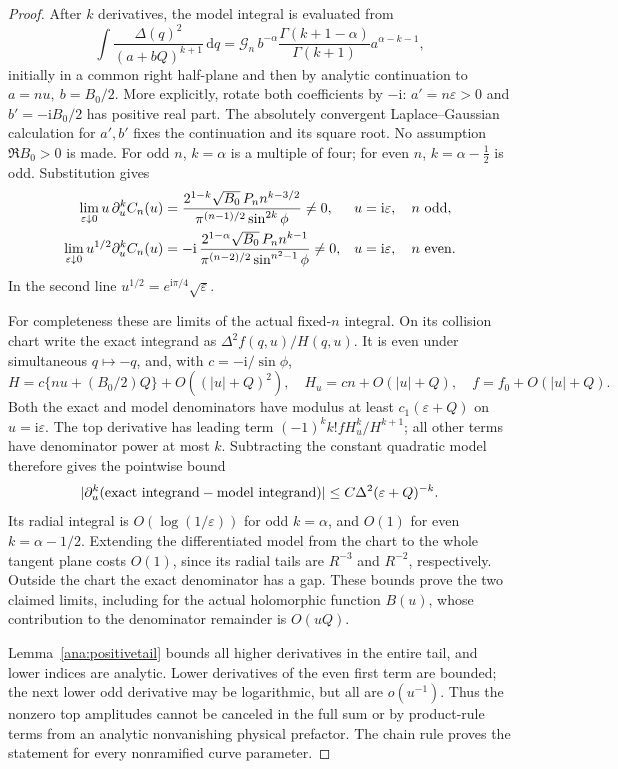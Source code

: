 \documentclass[11pt]{article}
\numberwithin{equation}{section}
\theoremstyle{definition}
\newcommand{\ii}{\mathrm i}
\newcommand{\dd}{\,\mathrm d}
\newcommand{\eps}{\varepsilon}
\begin{document}
\begin{proof}
After \(k\) derivatives, the model integral is evaluated from
\[
 \int\frac{\Delta(q)^2}{(a+bQ)^{k+1}}\dd q
 =\mathcal G_n\,b^{-\alpha}
    \frac{\Gamma(k+1-\alpha)}{\Gamma(k+1)}
    a^{\alpha-k-1},
\]
initially in a common right half-plane and then by analytic
continuation to \(a=nu,\ b=B_0/2\).
More explicitly, rotate both coefficients by \(-\ii\):
\(a'=n\eps>0\) and \(b'=-\ii B_0/2\) has positive real part.
The absolutely convergent Laplace--Gaussian calculation for
\(a',b'\) fixes the continuation and its square root. No assumption
\(\Re B_0>0\) is made.
For odd \(n\), \(k=\alpha\) is a multiple of four; for even
\(n\), \(k=\alpha-\tfrac12\) is odd. Substitution gives
\begin{align}
 \lim_{\eps\downarrow0}u\,\partial_u^k C_n(u)
 &=\frac{2^{1-k}\sqrt{B_0}\,P_n n^{k-3/2}}
         {\pi^{(n-1)/2}\sin^{2k}\phi}\ne0,
 &&u=\ii\eps,\quad n\ {\rm odd},\label{ana:oddamp}\\
 \lim_{\eps\downarrow0}u^{1/2}\partial_u^k C_n(u)
 &=-\ii\,\frac{2^{1-\alpha}\sqrt{B_0}\,P_n n^{k-1}}
         {\pi^{(n-2)/2}\sin^{n^2-1}\phi}\ne0,
 &&u=\ii\eps,\quad n\ {\rm even}.\label{ana:evenamp}
\end{align}
In the second line \(u^{1/2}=e^{\ii\pi/4}\sqrt\eps\).

For completeness these are limits of the actual fixed-\(n\)
integral. On its collision chart write the exact integrand as
\(\Delta^2 f(q,u)/H(q,u)\). It is even under simultaneous
\(q\mapsto-q\), and, with \(c=-\ii/\sin\phi\),
\[
 H=c\{nu+(B_0/2)Q\}+O((|u|+Q)^2),\quad
 H_u=cn+O(|u|+Q),\quad f=f_0+O(|u|+Q).
\]
Both the exact and model denominators have modulus at least
\(c_1(\eps+Q)\) on \(u=\ii\eps\). The top derivative has
leading term \((-1)^kk! fH_u^k/H^{k+1}\); all other terms have
denominator power at most \(k\). Subtracting the constant quadratic
model therefore gives the pointwise bound
\[
 |\partial_u^k(\hbox{exact integrand}-\hbox{model integrand})|
       \le C\Delta^2(\eps+Q)^{-k}.
\]
Its radial integral is \(O(\log(1/\eps))\) for odd
\(k=\alpha\), and \(O(1)\) for even \(k=\alpha-1/2\).
Extending the differentiated model from the chart to the whole
tangent plane costs \(O(1)\), since its radial tails are
\(R^{-3}\) and \(R^{-2}\), respectively. Outside the chart the
exact denominator has a gap. These bounds prove the two claimed
limits, including for the actual holomorphic function \(B(u)\),
whose contribution to the denominator remainder is \(O(uQ)\).

Lemma~\ref{ana:positivetail} bounds all higher derivatives in the
entire tail, and lower indices are analytic. Lower derivatives of
the even first term are bounded; the next lower odd derivative
may be logarithmic, but all are \(o(u^{-1})\).
Thus the nonzero top amplitudes cannot be canceled in the full
sum or by product-rule terms from an analytic nonvanishing
physical prefactor. The chain rule proves the statement for every
nonramified curve parameter.


\end{proof}
\end{document}
